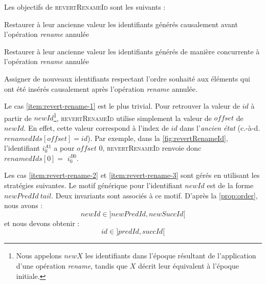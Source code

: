 \documentclass[12pt]{thesul}
\newcommand{\ie}{c.-à-d. }
\newcommand{\trm}[1]{\mathit{#1}}
\newcommand{\id}[3]{$\trm{#1}^{\trm{#2}}_{\trm{#3}}$}
\begin{document}
Les objectifs de \textsc{revertRenameId} sont les suivants :
\begin{enumerate*}[label=(\roman*)]
  \item \label{item:revert-rename-1}
    Restaurer à leur ancienne valeur les identifiants générés causalement avant l'opération \emph{rename} annulée
  \item \label{item:revert-rename-2}
    Restaurer à leur ancienne valeur les identifiants générés de manière concurrente à l'opération \emph{rename} annulée
  \item \label{item:revert-rename-3}
    Assigner de nouveaux identifiants respectant l'ordre souhaité aux éléments qui ont été insérés causalement après l'opération \emph{rename} annulée.
\end{enumerate*}

Le cas \ref{item:revert-rename-1} est le plus trivial.
Pour retrouver la valeur de $\trm{id}$ à partir de $\trm{newId}$\footnote{Nous appelons $\trm{newX}$ les identifiants dans l'époque résultant de l'application d'une opération \emph{rename}, tandis que $\trm{X}$ décrit leur équivalent à l'époque initiale.}, \textsc{revertRenameId} utilise simplement la valeur de $\trm{offset}$ de $\trm{newId}$.
En effet, cette valeur correspond à l'index de $\trm{id}$ dans l'\emph{ancien état} (\ie $\trm{renamedIds[offset]} = \trm{id}$).
Par exemple, dans la \autoref{fig:revertRenameId}, l'identifiant \id{i}{A1}{0} a pour $\trm{offset}$ 0, \textsc{revertRenameId} renvoie donc $\trm{renamedIds[0]} =$ \id{i}{B0}{0}.

Les cas \ref{item:revert-rename-2} et \ref{item:revert-rename-3} sont gérés en utilisant les stratégies suivantes.
Le motif générique pour l'identifiant $\trm{newId}$ est de la forme $\trm{newPredId~tail}$.
Deux invariants sont associés à ce motif.
D'après la \autoref{prop:order}, nous avons :
\[\trm{newId} \in ]\trm{newPredId}, \trm{newSuccId}[\]
et nous devons obtenir :
\[\trm{id} \in ]\trm{predId}, \trm{succId}[\]
\end{document}
